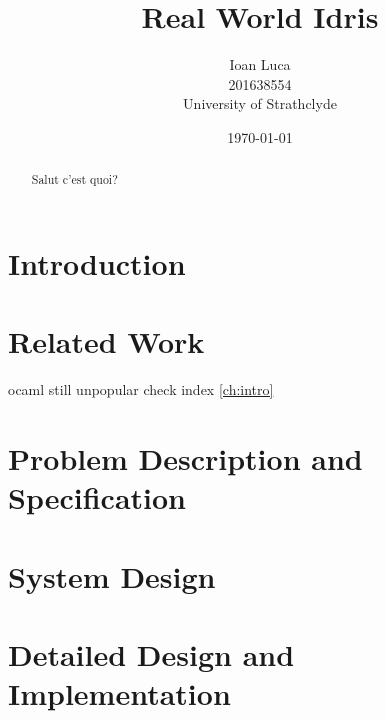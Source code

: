 \documentclass[a4paper, 12pt, oneside]{report} %
\title{Real World Idris}
\author{Ioan Luca \\ 201638554 \\ 
	\small University of Strathclyde} %
\date{\today}
\begin{document}
\maketitle





\begin{abstract}
    Salut c'est quoi?
\end{abstract}

\tableofcontents


\chapter{Introduction}\label{ch:intro}


\chapter{Related Work}\label{ch:techintro}
ocaml still unpopular check index \autoref{ch:intro}

\chapter{Problem Description and Specification}\label{ch:method}

\chapter{System Design}

\chapter{Detailed Design and Implementation}
\end{document}
